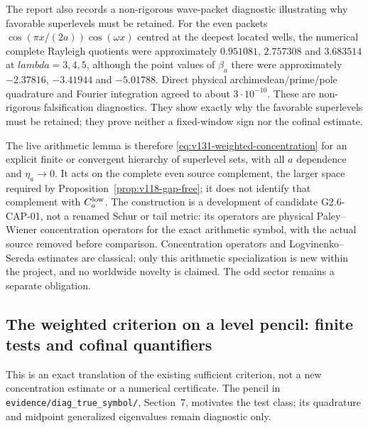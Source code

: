 \documentclass[11pt]{article}
\def\lambda{lambda}%
\theoremstyle{remark}
\begin{document}
The report  also records a non-rigorous wave-packet diagnostic illustrating why favorable superlevels must be retained.  For the even packets
$\cos(\pi x/(2a))\cos(\omega x)$ centred at the deepest located wells,
the numerical complete Rayleigh quotients were approximately
$0.951081$, $2.757308$ and $3.683514$ at $\lambda=3,4,5$, although the
point values of $\beta_a$ there were approximately $-2.37816$,
$-3.41944$ and $-5.01788$.  Direct physical archimedean/prime/pole
quadrature and Fourier integration agreed to about $3\cdot10^{-10}$.
These are non-rigorous falsification diagnostics.  They show exactly
why the favorable superlevels must be retained; they prove neither a
fixed-window sign nor the cofinal estimate.

The live arithmetic lemma is therefore
\eqref{eq:v131-weighted-concentration} for an explicit finite or
convergent hierarchy of superlevel sets, with all $a$ dependence and
$\eta_a\to0$.  It acts on the complete even source complement, the
larger space required by Proposition~\ref{prop:v118-gap-free}; it does
not identify that complement with $C_a^{\rm low}$.  The construction
is a development of candidate G2.6-CAP-01, not a renamed Schur or tail
metric: its operators are physical Paley--Wiener concentration
operators for the exact arithmetic symbol, with the actual source
removed before comparison.  Concentration operators and
Logvinenko--Sereda estimates are classical; only this arithmetic
specialization is new within the project, and no worldwide novelty is
claimed.  The odd sector remains a separate obligation.

\subsection{The weighted criterion on a level pencil: finite tests and cofinal quantifiers}

This is an exact translation of the existing sufficient criterion, not a
new concentration estimate or a numerical certificate. The pencil in
\texttt{evidence/diag\_true\_symbol/}, Section~7, motivates the test class;
its quadrature and midpoint generalized eigenvalues remain diagnostic only.
\end{document}
